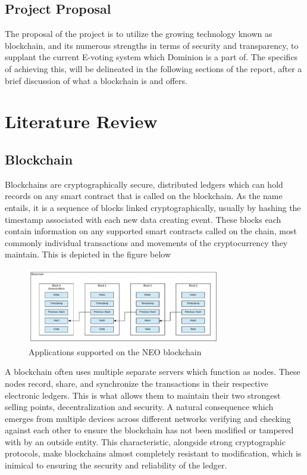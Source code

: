 \documentclass{article}
\begin{document}
\subsection{Project Proposal}
The proposal of the project is to utilize the growing technology known as blockchain, and its numerous strengths in terms of security and transparency, to supplant the current E-voting system which Dominion is a part of. The specifics of achieving this, will be delineated in the following sections of the report, after a brief discussion of what a blockchain is and offers.      

\section{Literature Review}

\subsection{Blockchain}
Blockchains are cryptographically secure,  distributed ledgers which can hold records on any smart contract that is called on the blockchain. As the name entails, it is a sequence of blocks linked cryptographically, usually by hashing the timestamp associated with each new data creating event.\cite{hawk1} These blocks each contain information on any supported smart contracts called on the chain, most commonly individual transactions and movements of the cryptocurrency they maintain. This is depicted in the figure below
\begin{figure}[ht!]
    \centering
    \includegraphics[width=0.75\textwidth]{blockchain.PNG}
    \caption{Applications supported on the NEO blockchain}
\end{figure}
\smallbreak \noindent
A blockchain often uses multiple separate servers which function as nodes. These nodes record, share, and synchronize the transactions in their respective electronic ledgers. This is what allows them to maintain their two strongest selling points, decentralization and security. A natural consequence which emerges from multiple devices across different networks verifying and checking against each other to ensure the blockchain has not been modified or tampered with by an outside entity.\cite{hawk1} This characteristic, alongside strong cryptographic protocols, make blockchains almost completely resistant to modification, which is inimical to ensuring the security and reliability of the ledger. 
\end{document}
